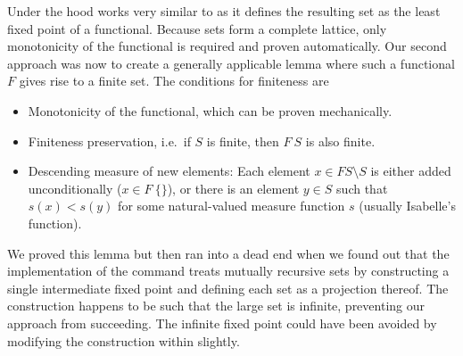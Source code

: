 \documentclass[a4paper,parskip=half,BCOR=8mm,DIV=calc,12pt]{scrbook}
\begin{document}
Under the hood  works very similar to  as it defines the resulting set as the least fixed point of a functional. Because sets form a complete lattice, only monotonicity of the functional is required and proven automatically. Our second approach was now to create a generally applicable lemma where such a functional $F$ gives rise to a finite set. The conditions for finiteness are
\begin{itemize}
\item Monotonicity of the functional, which can be proven mechanically.
\item Finiteness preservation, i.e.\ if $S$ is finite, then $F\ S$ is also finite.
\item Descending measure of new elements: Each element $x\in F S \setminus S$ is either added unconditionally ($x\in F\ \{\}$), or there is an element $y \in S$ such that $s(x) < s(y)$ for some natural-valued measure function $s$ (usually Isabelle’s  function).
\end{itemize}

We proved this lemma but then ran into a dead end when we found out that the implementation of the  command treats mutually recursive sets by constructing a single intermediate fixed point and defining each set as a projection thereof. The construction happens to be such that the large set is infinite, preventing our approach from succeeding. The infinite fixed point could have been avoided by modifying the construction within  slightly.
\end{document}
